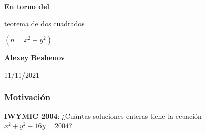 \documentclass[handout]{beamer}
\begin{document}

\begin{frame}[noframenumbering]
  \begin{center}
    {\LARGE\bf En torno del

      teorema de dos cuadrados

      $(n = x^2 + y^2)$

    }

    \vspace{3em}

    {\large\bf Alexey Beshenov}

    \vspace{4em}

    11/11/2021

  \end{center}
\end{frame}


\begin{frame}[fragile]
  \frametitle{Motivación}

  \begin{shaded}
    \textbf{IWYMIC 2004}: ¿Cuántas soluciones enteras tiene la ecuación
    $x^2 + y^2 - 16y = 2004$?
  \end{shaded}
\end{frame}

\end{document}
